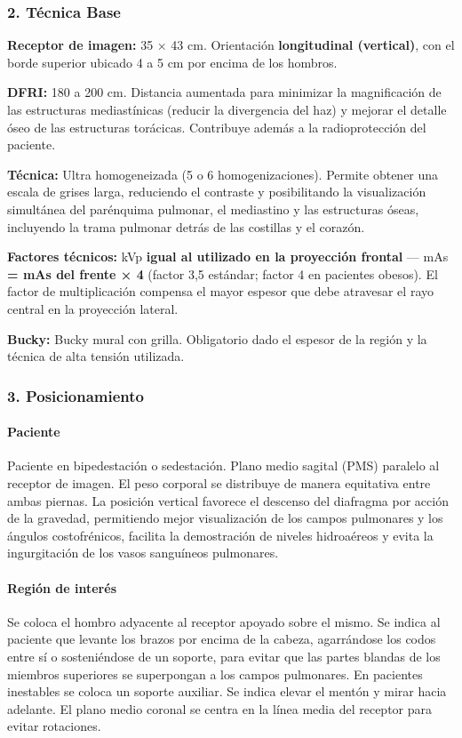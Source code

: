 	\subsubsection*{2. Técnica Base}
	
	\textbf{Receptor de imagen:} 35 × 43 cm. Orientación \textbf{longitudinal (vertical)}, con el borde superior ubicado 4 a 5 cm por encima de los hombros.
	
	\textbf{DFRI:} 180 a 200 cm. Distancia aumentada para minimizar la magnificación de las estructuras mediastínicas (reducir la divergencia del haz) y mejorar el detalle óseo de las estructuras torácicas. Contribuye además a la radioprotección del paciente.
	
	\textbf{Técnica:} Ultra homogeneizada (5 o 6 homogenizaciones). Permite obtener una escala de grises larga, reduciendo el contraste y posibilitando la visualización simultánea del parénquima pulmonar, el mediastino y las estructuras óseas, incluyendo la trama pulmonar detrás de las costillas y el corazón.
	
	\textbf{Factores técnicos:} kVp \textbf{igual al utilizado en la proyección frontal} --- mAs \textbf{= mAs del frente × 4} (factor 3,5 estándar; factor 4 en pacientes obesos). El factor de multiplicación compensa el mayor espesor que debe atravesar el rayo central en la proyección lateral.
	
	\textbf{Bucky:} Bucky mural con grilla. Obligatorio dado el espesor de la región y la técnica de alta tensión utilizada.
	
	\subsubsection*{3. Posicionamiento}
	
	\paragraph{Paciente}
	Paciente en bipedestación o sedestación. Plano medio sagital (PMS) paralelo al receptor de imagen. El peso corporal se distribuye de manera equitativa entre ambas piernas. La posición vertical favorece el descenso del diafragma por acción de la gravedad, permitiendo mejor visualización de los campos pulmonares y los ángulos costofrénicos, facilita la demostración de niveles hidroaéreos y evita la ingurgitación de los vasos sanguíneos pulmonares.
	
	\paragraph{Región de interés}
	Se coloca el hombro adyacente al receptor apoyado sobre el mismo. Se indica al paciente que levante los brazos por encima de la cabeza, agarrándose los codos entre sí o sosteniéndose de un soporte, para evitar que las partes blandas de los miembros superiores se superpongan a los campos pulmonares. En pacientes inestables se coloca un soporte auxiliar. Se indica elevar el mentón y mirar hacia adelante. El plano medio coronal se centra en la línea media del receptor para evitar rotaciones.
	
